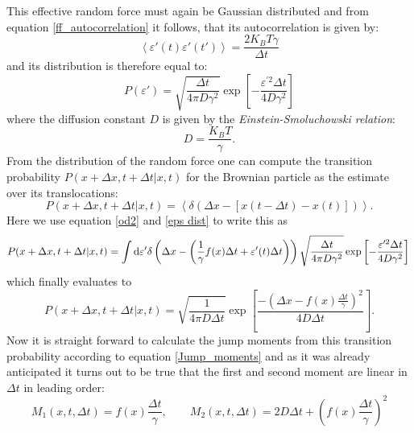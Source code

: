 This effective random force must again be Gaussian distributed and from equation \eqref{ff_autocorrelation} it follows, that its autocorrelation is given by:
\begin{equation}
    \left< \varepsilon'(t) \varepsilon'(t') \right> = \frac{2 K_B T \gamma}{ \Delta t}
    \label{ff_eff_autocorrelation}
\end{equation}
and its distribution is therefore equal to:
\begin{equation}
    P(\varepsilon ' ) = \sqrt{\frac{\Delta t}{4 \pi D \gamma^{2}}} \exp \left[ - \frac{\varepsilon ^{\prime 2} \Delta t}{4 D \gamma^{2}} \right]
    \label{eps dist}
\end{equation}
where the diffusion constant $D$ is given by the \emph{Einstein-Smoluchowski relation}:
\begin{equation}
    D = \frac{K_B T}{\gamma}.
    \label{ESR}
\end{equation}
From the distribution of the random force one can compute the transition probability $P(x+\Delta x, t+ \Delta t| x, t)$ for the Brownian particle as the estimate over its translocations:
\begin{equation}
    P(x+\Delta x,t+\Delta t|x,t)  = \left< \delta \left(  \Delta x - \left[x(t-\Delta t) - x(t)\right] \right)\right>.
\end{equation}
Here we use equation \eqref{od2} and \eqref{eps dist} to write this as
\begin{equation}
     P(x+\Delta x,t+\Delta t|x,t) = \int {\rm d}\varepsilon ' \delta \left(  \Delta x - \left( \frac{1}{\gamma} f(x) \Delta t + \varepsilon'(t) \Delta t \right) \right)  \sqrt{\frac{\Delta t}{4 \pi D \gamma^{2}}} \exp \left[ - \frac{\varepsilon  ^{\prime 2} \Delta t}{4 D \gamma^{2}} \right] \nonumber\\
 \end{equation}
 which finally evaluates to 
 \begin{equation}
      P(x+\Delta x,t+\Delta t|x,t) = \sqrt{\frac{1}{4 \pi D \Delta t}} \exp \left[ \frac{-\left(\Delta x - f(x) \frac{\Delta t}{\gamma} \right)^2}{4 D \Delta t} \right].
    \label{BM_transition_probability}
\end{equation}
Now it is straight forward to calculate the jump moments from this transition probability according to equation \eqref{Jump_moments} and as it was already anticipated it turns out to be true that the first and second moment are linear in $\Delta t$ in leading order: 
\begin{equation}
    M_1(x,t,\Delta t) = f(x)\frac{\Delta t}{\gamma}, \qquad M_2(x,t,\Delta t) = 2 D \Delta t + \left(f(x)\frac{\Delta t}{\gamma} \right)^{2}
    \label{BM_jump_moments}
\end{equation}
